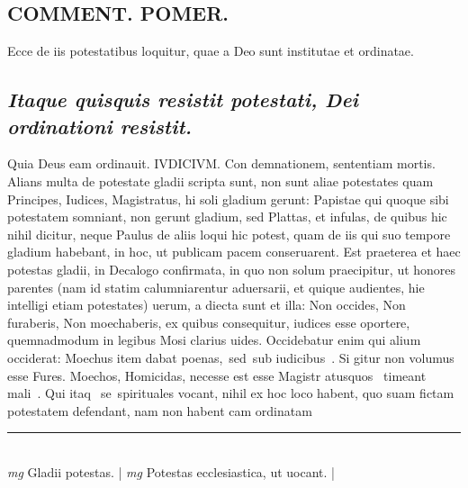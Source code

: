 \documentclass{article}
\begin{document}
\begin{pages}
\section*{COMMENT. POMER.  }\pstart Ecce de iis potestatibus loquitur, quae a Deo sunt institutae et ordinatae.   \pend
{}
{}
\subsection*{\textit{Itaque quisquis resistit potestati, Dei ordinationi resistit. }}\pstart Quia Deus eam ordinauit. IVDICIVM. Con demnationem, sententiam mortis. Alians multa de potestate gladii scripta sunt, non sunt aliae potestates quam Principes, Iudices, Magistratus, hi soli gladium gerunt: Papistae qui quoque sibi potestatem somniant, non gerunt gladium, sed Plattas, et infulas, de quibus hic nihil dicitur, neque Paulus de aliis loqui hic potest, quam de iis qui suo tempore gladium habebant, in hoc, ut publicam pacem conseruarent. Est praeterea et haec potestas gladii, in Decalogo confirmata, in quo non solum praecipitur, ut honores parentes (nam id statim calumniarentur aduersarii, et quique audientes, hie intelligi etiam potestates) uerum, a diecta sunt et illa: Non occides, Non furaberis, Non moechaberis, ex quibus consequitur, iudices esse oportere, quemnadmodum in legibus Mosi clarius uides. Occidebatur enim qui alium occiderat: Moechus item dabat poenas, sed sub iudicibus . Si gitur non volumus esse Fures. Moechos, Homicidas, necesse est esse Magistr atusquos  timeant mali . Qui itaq se spirituales vocant, nihil ex hoc loco habent, quo suam fictam potestatem defendant, nam non habent cam ordinatam  \pend
\vspace{0.5cm}\noindent
\vspace{0.2cm}\rule{1cm}{0.2pt}\\ 
\hspace{0.2cm}\textit{mg}
\footnotesize Gladii potestas.  
\normalsize| 
\hspace{0.2cm}\textit{mg}
\footnotesize Potestas ecclesiastica, ut uocant.  
\normalsize| 

\end{pages}
\end{document}
